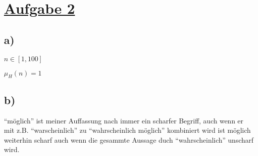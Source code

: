 \section*{\underline{Aufgabe 2}}

\subsection*{a)}

$n \in [1,100]$

$\mu_H(n)=1$


\subsection*{b)}

``möglich'' ist meiner Auffassung nach immer ein scharfer Begriff,
auch wenn er mit z.B. ``warscheinlich'' zu ``wahrscheinlich möglich'' kombiniert wird
ist möglich weiterhin scharf auch wenn die gesammte Aussage duch ``wahrscheinlich'' unscharf wird.